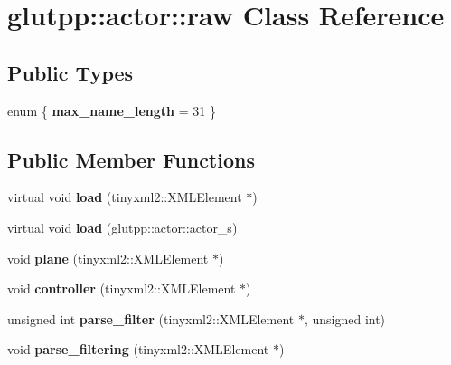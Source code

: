 \hypertarget{classglutpp_1_1actor_1_1raw}{\section{glutpp\-:\-:actor\-:\-:raw \-Class \-Reference}
\label{classglutpp_1_1actor_1_1raw}
}
\subsection*{\-Public \-Types}
\begin{DoxyCompactItemize}
\item 
enum \{ {\bfseries max\-\_\-name\-\_\-length} =  31
 \}
\end{DoxyCompactItemize}
\subsection*{\-Public \-Member \-Functions}
\begin{DoxyCompactItemize}
\item 
\hypertarget{classglutpp_1_1actor_1_1raw_acc3b39cd36f288b408ec8ba8dbc31789}{virtual void {\bfseries load} (tinyxml2\-::\-X\-M\-L\-Element $\ast$)}\label{classglutpp_1_1actor_1_1raw_acc3b39cd36f288b408ec8ba8dbc31789}

\item 
\hypertarget{classglutpp_1_1actor_1_1raw_ac4f1df0289c70484f4ed9737757ae853}{virtual void {\bfseries load} (glutpp\-::actor\-::actor\-\_\-s)}\label{classglutpp_1_1actor_1_1raw_ac4f1df0289c70484f4ed9737757ae853}

\item 
\hypertarget{classglutpp_1_1actor_1_1raw_ab7baf7c3e1a7b3d52c966179b4839d55}{void {\bfseries plane} (tinyxml2\-::\-X\-M\-L\-Element $\ast$)}\label{classglutpp_1_1actor_1_1raw_ab7baf7c3e1a7b3d52c966179b4839d55}

\item 
\hypertarget{classglutpp_1_1actor_1_1raw_a6a47b4b67928acb78dad4e95a6d644bd}{void {\bfseries controller} (tinyxml2\-::\-X\-M\-L\-Element $\ast$)}\label{classglutpp_1_1actor_1_1raw_a6a47b4b67928acb78dad4e95a6d644bd}

\item 
\hypertarget{classglutpp_1_1actor_1_1raw_a9f875bd2b16aed06c8f117b56ffb8ddc}{unsigned int {\bfseries parse\-\_\-filter} (tinyxml2\-::\-X\-M\-L\-Element $\ast$, unsigned int)}\label{classglutpp_1_1actor_1_1raw_a9f875bd2b16aed06c8f117b56ffb8ddc}

\item 
\hypertarget{classglutpp_1_1actor_1_1raw_a8622c50f790989b296b5666571b7e8a2}{void {\bfseries parse\-\_\-filtering} (tinyxml2\-::\-X\-M\-L\-Element $\ast$)}\label{classglutpp_1_1actor_1_1raw_a8622c50f790989b296b5666571b7e8a2}

\end{DoxyCompactItemize}
